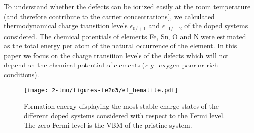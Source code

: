 To understand whether the defects can be ionized easily at the room temperature (and therefore contribute to the carrier concentrations), we calculated thermodynamical charge transition levels $\epsilon_{0/+1}$ and $\epsilon_{+1/+2}$ of the doped systems considered.
The chemical potentials of elements Fe, Sn, O and N were estimated as the total energy per atom of the natural occurrence of the element. In this paper we focus on the charge transition levels of the defects which will not depend on the chemical potential of elements (\textit{e.g.}\ oxygen poor or rich conditions).



\begin{figure}[t!]
\begin{center}
\texttt{[image: 2-tmo/figures-fe2o3/ef\_hematite.pdf]} %
\end{center}
\caption{Formation energy displaying the most stable charge states of the different doped systems considered with respect to the Fermi level. The zero Fermi level is the VBM of the pristine system.} \label{fe2o3:fig:ef}
\end{figure}



